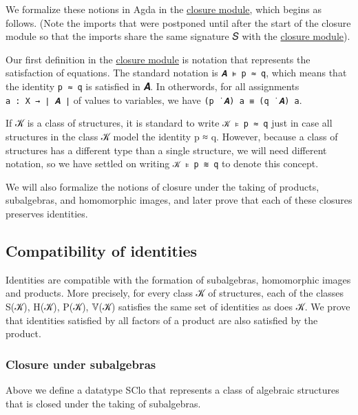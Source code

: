 \documentclass[sigplan,screen]{acmart}
\newcommand\closuremodule{\href{https://gitlab.com/ualib/ualib.gitlab.io/-/blob/master/congruences.lagda.rst}{closure module}\xspace}
\begin{document}
We formalize these notions in Agda in the \closuremodule, which begins as follows. (Note the imports that were postponed until after the start of the closure module so that the imports share the same signature 𝑆 with the \closuremodule).

\begin{code}\end{code}
Our first definition in the \closuremodule is notation that represents the satisfaction of equations. The standard notation is \texttt{𝑨\ ⊧\ p\ ≈\ q}, which means that the identity \texttt{p\ ≈\ q} is satisfied in 𝑨. In otherwords, for all assignments \texttt{a\ :\ X\ →\ ∣\ 𝑨\ ∣} of values to variables, we have \texttt{(p\ ̇\ 𝑨)\ a\ ≡\ (q\ ̇\ 𝑨)\ a}.

If 𝒦 is a class of structures, it is standard to write \texttt{𝒦\ ⊧\ p\ ≈\ q} just in case all structures in the class 𝒦 model the identity p ≈ q. However, because a class of structures has a different type than a single structure, we will need different notation, so we have settled on writing \texttt{𝒦\ ⊧\ p\ ≋\ q} to denote this concept.

We will also formalize the notions of closure under the taking of products, subalgebras, and homomorphic images, and later prove that each of these closures preserves identities.
\begin{code}\end{code}

\subsection{Compatibility of identities}\label{compatibility-of-identities}
Identities are compatible with the formation of subalgebras, homomorphic images and products. More precisely, for every class 𝒦 of structures, each of the classes S(𝒦), H(𝒦), P(𝒦), 𝕍(𝒦) satisfies the same set of identities as does 𝒦. We prove that identities satisfied by all factors of a product are also satisfied by the product.
\begin{code}\end{code}

\subsubsection{Closure under subalgebras}\label{closure-under-subalgebras}
Above we define a datatype SClo that represents a class of algebraic structures that is closed under the taking of subalgebras.
\end{document}
